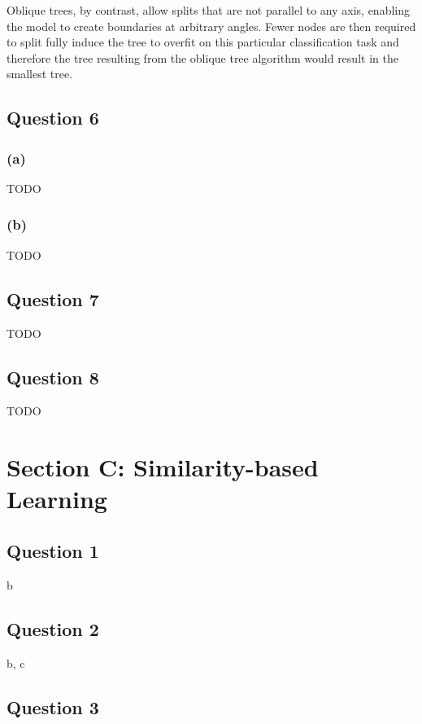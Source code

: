 \documentclass[10pt]{article}
\begin{document}
Oblique trees, by contrast, allow splits that are not parallel to any axis, enabling the model to create
boundaries at arbitrary angles. Fewer nodes are then required to split fully induce the tree to overfit
on this particular classification task and therefore the tree resulting from the oblique
tree algorithm would result in the smallest tree.

\subsection*{Question 6}

\subsubsection*{(a)}

TODO

\subsubsection*{(b)}

TODO

\subsection*{Question 7}

TODO

\subsection*{Question 8}

TODO

\section*{Section C: Similarity-based Learning}

\subsection*{Question 1}

b

\subsection*{Question 2}

b, c

\subsection*{Question 3}
\end{document}
